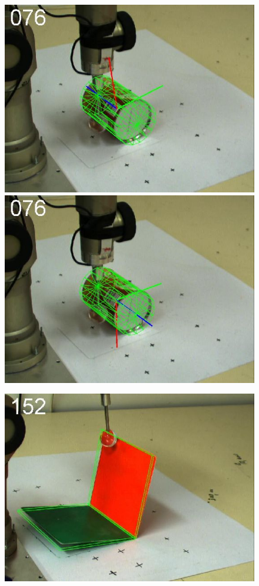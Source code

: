 \begin{figure}[htbp]
{\includegraphics[width=\imgAXwid]{images/A3_LWPR1_39_1}
\includegraphics[width=\imgAXwid]{images/A3_physx_39_1}
}
\centerline{
\includegraphics[width=\imgAXwid]{images/A1_2exp_667_2}
}
\end{figure}
